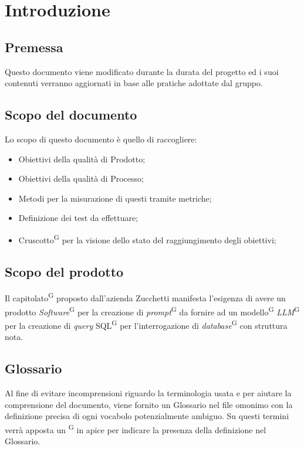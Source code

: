 \documentclass[5pt]{article}
\begin{document}
	\pagebreak
	
	\section{Introduzione}
	
	\subsection{Premessa}
	Questo documento viene modificato durante la durata del progetto ed i suoi contenuti verranno aggiornati in base alle pratiche adottate dal gruppo.
	
	\subsection{Scopo del documento}
	Lo scopo di questo documento è quello di raccogliere:
	\begin{itemize}
		\item Obiettivi della qualità di Prodotto;
		\item Obiettivi della qualità di Processo;
		\item Metodi per la misurazione di questi tramite metriche;
		\item Definizione dei test da effettuare;
		\item Cruscotto\textsuperscript{G} per la visione dello stato del raggiungimento degli obiettivi;
	\end{itemize}
	
	\subsection{Scopo del prodotto}
	Il capitolato\textsuperscript{G} proposto dall'azienda Zucchetti manifesta l'esigenza di avere un prodotto \textit{Software}\textsuperscript{G} per la creazione di \textit{prompt}\textsuperscript{G} da fornire ad un modello\textsuperscript{G} \textit{LLM}\textsuperscript{G} per la creazione di \textit{query} SQL\textsuperscript{G} per l'interrogazione di \textit{database}\textsuperscript{G} con struttura nota.
	
	\subsection{Glossario}
	Al fine di evitare incomprensioni riguardo la terminologia usata e per aiutare la comprensione del documento,
	viene fornito un Glossario nel file omonimo con la definizione precisa di ogni vocabolo potenzialmente ambiguo. Su questi termini verrà apposta un \textsuperscript{G} in apice per indicare la presenza della definizione nel Glossario.
	
\end{document}

